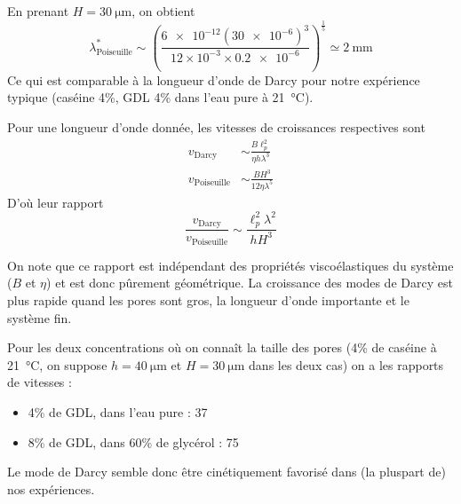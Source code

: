 \documentclass[12pt,a4paper]{article}
\begin{document}
En prenant $H=\SI{30}{\micro\metre}$, on obtient
\begin{equation}
\lambda^*_\text{Poiseuille} \sim \left(\frac{\num{6e-12} (\num{30e-6})^3}{12 \times
10^{-3} \times \num{0.2e-6}}\right)^\frac{1}{5} \simeq \SI{2}{\milli\metre}
\end{equation}
Ce qui est comparable à la longueur d'onde de Darcy pour notre expérience typique (caséine 4\%, GDL 4\% dans l'eau pure à \SI{21}{\celsius}).

Pour une longueur d'onde donnée, les vitesses de croissances respectives sont
\begin{align}
v_\text{Darcy} &\sim \frac{B \ell_p^2}{\eta h \lambda^3}\\
v_\text{Poiseuille} &\sim \frac{B H^3}{12\eta \lambda^5}
\end{align}
D'où leur rapport
\begin{equation}
\frac{v_\text{Darcy}}{v_\text{Poiseuille}} \sim \frac{\ell_p^2\lambda^2}{hH^3}
\end{equation}

On note que ce rapport est indépendant des propriétés viscoélastiques du système ($B$ et $\eta$) et est donc pûrement géométrique. La croissance des modes de Darcy est plus rapide quand les pores sont gros, la longueur d'onde importante et le système fin.

Pour les deux concentrations où on connaît la taille des pores (4\% de caséine à \SI{21}{\celsius}, on suppose $h=\SI{40}{\micro\metre}$ et $H=\SI{30}{\micro\metre}$ dans les deux cas) on a les rapports de vitesses :
\begin{itemize} 
\item 4\% de GDL, dans l'eau pure : 37
\item 8\% de GDL, dans 60\% de glycérol : 75
\end{itemize}
Le mode de Darcy semble donc être cinétiquement favorisé dans (la pluspart de) nos expériences.
\end{document}
